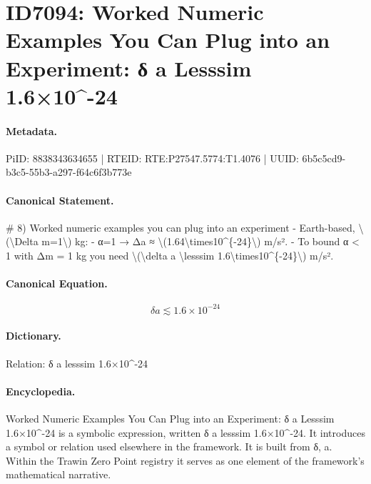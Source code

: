 \section*{ID7094: Worked Numeric Examples You Can Plug into an Experiment: δ a Lesssim 1.6×10\textasciicircum{}-24}
\paragraph{Metadata.}
PiID: 8838343634655 | RTEID: RTE:P27547.5774:T1.4076 | UUID: 6b5c5cd9-b3c5-55b3-a297-f64c6f3b773e

\paragraph{Canonical Statement.}
\# 8) Worked numeric examples you can plug into an experiment - Earth-based, \textbackslash{}(\textbackslash{}Delta m=1\textbackslash{}) kg: - α=1 → Δa ≈ \textbackslash{}(1.64\textbackslash{}times10\textasciicircum{}\{-24\}\textbackslash{}) m/s². - To bound α < 1 with Δm = 1 kg you need \textbackslash{}(\textbackslash{}delta a \textbackslash{}lesssim 1.6\textbackslash{}times10\textasciicircum{}\{-24\}\textbackslash{}) m/s².

\paragraph{Canonical Equation.}
\[
\delta a \lesssim 1.6\times10^{-24}
\]

\paragraph{Dictionary.}
Relation: δ a lesssim 1.6×10\textasciicircum{}-24

\paragraph{Encyclopedia.}
Worked Numeric Examples You Can Plug into an Experiment: δ a Lesssim 1.6×10\textasciicircum{}-24 is a symbolic expression, written δ a lesssim 1.6×10\textasciicircum{}-24. It introduces a symbol or relation used elsewhere in the framework. It is built from δ, a. Within the Trawin Zero Point registry it serves as one element of the framework's mathematical narrative.

